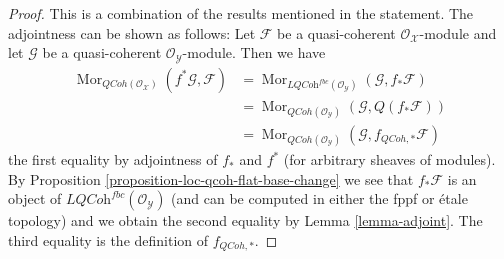 \documentclass[10pt,a4paper]{amsart}
\theoremstyle{plain}
\theoremstyle{definition}
\theoremstyle{remark}
\numberwithin{equation}{subsection}
\def\Mor{\mathop{\mathrm{Mor}}\nolimits}
\def\QCoh{\mathit{QCoh}}
\begin{document}
\begin{proof}
This is a combination of the results mentioned in the statement.
The adjointness can be shown as follows: Let $\mathcal{F}$
be a quasi-coherent $\mathcal{O}_\mathcal{X}$-module and let
$\mathcal{G}$ be a quasi-coherent $\mathcal{O}_\mathcal{Y}$-module.
Then we have
\begin{align*}
\Mor_{\QCoh(\mathcal{O}_\mathcal{X})}(f^*\mathcal{G}, \mathcal{F})
& =
\Mor_{\textit{LQCoh}^{fbc}(\mathcal{O}_\mathcal{Y})}
(\mathcal{G}, f_*\mathcal{F}) \\
& =
\Mor_{\QCoh(\mathcal{O}_\mathcal{Y})}(\mathcal{G}, Q(f_*\mathcal{F}))
\\
& =
\Mor_{\QCoh(\mathcal{O}_\mathcal{Y})}(\mathcal{G},
f_{\QCoh, *}\mathcal{F})
\end{align*}
the first equality by adjointness of $f_*$ and $f^*$ (for arbitrary sheaves
of modules). By
Proposition \ref{proposition-loc-qcoh-flat-base-change}
we see that $f_*\mathcal{F}$ is an object of
$\textit{LQCoh}^{fbc}(\mathcal{O}_\mathcal{Y})$
(and can be computed in either the fppf or \'etale topology) and we
obtain the second equality by Lemma \ref{lemma-adjoint}. The third
equality is the definition of $f_{\QCoh, *}$.


\end{proof}
\end{document}
